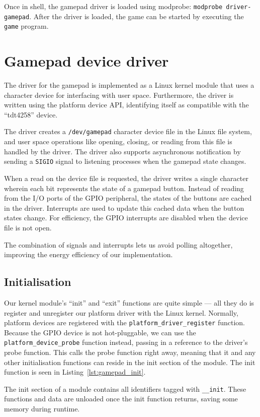 Once in shell, the gamepad driver is loaded using modprobe: \texttt{modprobe driver-gamepad}. After the driver is loaded, the game can be started by executing the \texttt{game} program.

\section{Gamepad device driver}
The driver for the gamepad is implemented as a Linux kernel module that uses a character device for interfacing with user space. Furthermore, the driver is written using the platform device API, identifying itself as compatible with the ``tdt4258'' device.

The driver creates a \texttt{/dev/gamepad} character device file in the Linux file system, and user space operations like opening, closing, or reading from this file is handled by the driver. The driver also supports asynchronous notification by sending a \texttt{SIGIO} signal to listening processes when the gamepad state changes.

When a read on the device file is requested, the driver writes a single character wherein each bit represents the state of a gamepad button. Instead of reading from the I/O ports of the GPIO peripheral, the states of the buttons are cached in the driver. Interrupts are used to update this cached data when the button states change. For efficiency, the GPIO interrupts are disabled when the device file is not open.

The combination of signals and interrupts lets us avoid polling altogether, improving the energy efficiency of our implementation.

\subsection{Initialisation}
Our kernel module's ``init'' and ``exit'' functions are quite simple --- all they do is register and unregister our platform driver with the Linux kernel. Normally, platform devices are registered with the \texttt{platform\_driver\_register} function. Because the GPIO device is not hot-pluggable, we can use the \texttt{platform\_device\_probe} function instead, passing in a reference to the driver's probe function. This calls the probe function right away, meaning that it and any other initialisation functions can reside in the init section of the module. The init function is seen in Listing~\ref{lst:gamepad_init}.

The init section of a module contains all identifiers tagged with \texttt{\_\_init}. These functions and data are unloaded once the init function returns, saving some memory during runtime.

